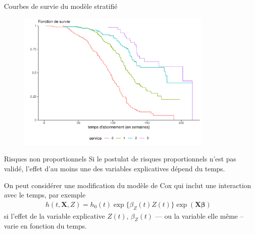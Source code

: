 \documentclass[
  ignorenonframetext,
]{beamer}
\begin{document}
\begin{frame}{Courbes de survie du modèle stratifié}
\protect\hypertarget{courbes-de-survie-du-moduxe8le-stratifiuxe9}{}
\begin{figure}

{\centering \includegraphics[width=0.85\textwidth,height=\textheight]{MATH60602-diapos9_files/figure-beamer/unnamed-chunk-6-1.pdf}

}

\end{figure}
\end{frame}

\begin{frame}{Risques non proportionnels}
\protect\hypertarget{risques-non-proportionnels}{}
Si le postulat de risques proportionnels n'est pas validé, l'effet d'au
moins une des variables explicatives dépend du temps.

On peut considérer une modification du modèle de Cox qui inclut une
interaction avec le temps, par exemple \begin{align*}
h(t,\mathbf{X}, Z) = h_0(t)\exp\{\beta_Z(t) Z(t)\}\exp(\mathbf{X}\boldsymbol{\beta})
\end{align*} si l'effet de la variable explicative \(Z(t)\),
\(\beta_Z(t)\) --- ou la variable elle même -- varie en fonction du
temps.
\end{frame}
\end{document}
